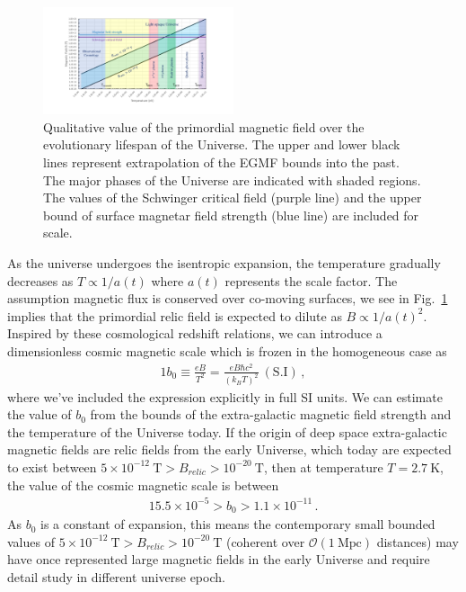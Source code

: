 \documentclass[twocolumn,preprintnumbers,amsmath,amssymb]{revtex4-2}
\begin{document}
\begin{figure}[htbp]
 \centering \includegraphics[trim=110 50 120 40,clip,width=0.5\textwidth]{./plots/relic_plot.pdf}
 \caption{Qualitative value of the primordial magnetic field over the evolutionary lifespan of the Universe. The upper and lower black lines represent extrapolation of the EGMF bounds into the past. The major phases of the Universe are indicated with shaded regions. The values of the Schwinger critical field (purple line) and the upper bound of surface magnetar field strength (blue line) are included for scale.\label{relic_plot}}
\end{figure}

As the universe undergoes the isentropic expansion,  the temperature gradually decreases as $T\propto1/a(t)$ where $a(t)$ represents the scale factor. The assumption magnetic flux is conserved over co-moving surfaces, we see in Fig.~\ref{relic_plot} implies that the primordial relic field is expected to dilute as $B\propto1/a(t)^{2}$. Inspired by these cosmological redshift relations, we can introduce a dimensionless cosmic magnetic scale which is frozen in the homogeneous case as
\begin{alignat}{1}
 \label{Bo} b_{0}\equiv\frac{eB}{T^{2}}=\frac{eB\hbar c^{2}}{(k_{B}T)^{2}}\ \mathrm{(S.I)}\,,
\end{alignat}
where we've included the expression explicitly in full SI units. We can estimate the value of $b_{0}$ from the bounds of the extra-galactic magnetic field strength and the temperature of the Universe today. If the origin of deep space extra-galactic magnetic fields are relic fields from the early Universe, which today are expected to exist between $5\times10^{-12}\ \mathrm{T}>B_{relic}>10^{-20}\ \mathrm{T}$, then at temperature $T=2.7\ \mathrm{K}$, the value of the cosmic magnetic scale is between
\begin{alignat}{1}
 \label{BoScale} 5.5\times10^{-5}>b_{0}>1.1\times10^{-11}\,.
\end{alignat}
As $b_0$ is a constant of expansion, this means the contemporary small bounded values of $5\times10^{-12}\ \mathrm{T}>B_{relic}>10^{-20}\ \mathrm{T}$ (coherent over $\mathcal{O}(1\ \mathrm{Mpc})$ distances) may have once represented large magnetic fields in the early Universe and require detail study in different universe epoch.
\end{document}
